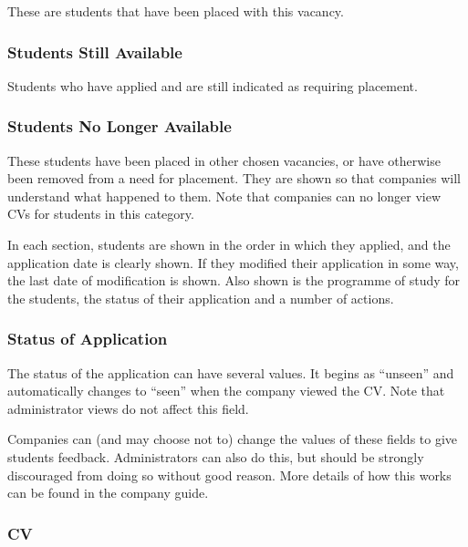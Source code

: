 \documentclass[12 pt]{book}
\begin{document}
These are students that have been placed with this vacancy.

\subsubsection{Students Still Available}

Students who have applied and are still indicated as requiring placement.

\subsubsection{Students No Longer Available}

These students have been placed in other chosen vacancies, or have otherwise
been removed from a need for placement. They are shown so that companies will
understand what happened to them. Note that companies can no longer view CVs
for students in this category.

In each section, students are shown in the order in which they applied, and
the application date is clearly shown. If they modified their application in
some way, the last date of modification is shown. Also shown is the programme
of study for the students, the status of their application and a number of
actions.


\subsubsection{Status of Application}

The status of the application can have several values. It begins as ``unseen''
and automatically changes to ``seen'' when the company viewed the CV. Note that
administrator views do not affect this field.

Companies can (and may choose not to) change the values of these fields to
give students feedback. Administrators can also do this, but should be
strongly discouraged from doing so without good reason. More details of how
this works can be found in the company guide.

\subsubsection{CV}
\end{document}

